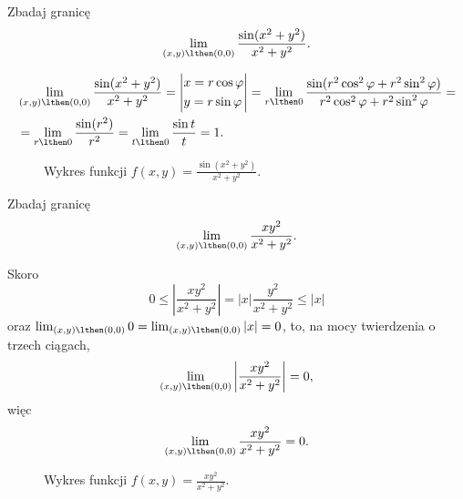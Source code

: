 \begin{example}
    Zbadaj granicę
    \[ \lim_{(x, y)\lthen (0, 0)} \frac{\sin(x^2 + y^2)}{x^2 + y^2}. \]
\end{example}
\begin{solution}
    \begin{align*}
        &\lim_{(x, y)\lthen (0, 0)} \frac{\sin(x^2 + y^2)}{x^2 + y^2} = \left|\begin{alignedat}{2}&x = r\cos\varphi \\ &y = r\sin\varphi\end{alignedat}\right| = \lim_{r\lthen 0} \frac{\sin(r^2\cos^2\varphi + r^2\sin^2\varphi)}{r^2\cos^2\varphi + r^2\sin^2\varphi} = \\
        &= \lim_{r\lthen 0} \frac{\sin(r^2)}{r^2} = \lim_{t\lthen 0} \frac{\sin t}{t} = 1.
    \end{align*}
\end{solution}

\begin{figure}[H]
    \centering
    \caption{Wykres funkcji $f(x, y) = \frac{\sin(x^2 + y^2)}{x^2 + y^2}$.}
\end{figure}

\begin{example}
    Zbadaj granicę
    \[ \lim_{(x, y)\lthen (0, 0)} \frac{xy^2}{x^2 + y^2}. \]
\end{example}
\begin{solution}
    Skoro
    \[ 0 \leq \left|\frac{xy^2}{x^2 + y^2}\right| = |x|\frac{y^2}{x^2 + y^2} \leq |x| \]
    oraz $\lim_{(x, y)\lthen (0, 0)} 0 = \lim_{(x, y)\lthen (0, 0)} |x| = 0$, to, na mocy twierdzenia o trzech ciągach,
    \[ \lim_{(x, y)\lthen (0, 0)} \left|\frac{xy^2}{x^2 + y^2}\right| = 0, \]
    więc
    \[ \lim_{(x, y)\lthen (0, 0)} \frac{xy^2}{x^2 + y^2} = 0. \]
\end{solution}

\begin{figure}[H]
    \centering
    \caption{Wykres funkcji $f(x, y) = \frac{xy^2}{x^2 + y^2}$.}
\end{figure}


